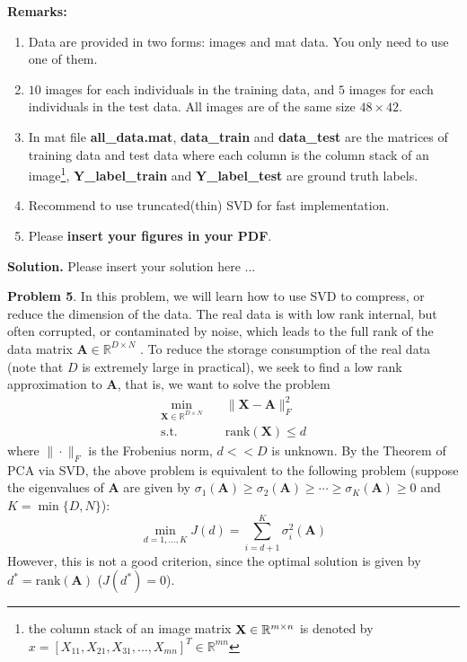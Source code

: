 \documentclass[english,onecolumn]{IEEEtran}
\newcommand{\Rbb}{\mathbb{R}}
\newcommand{\bX}{{\bf X}}
\begin{document}
{\bf Remarks:}
\begin{enumerate}
    \item Data are provided in two forms: images and mat data. You only need to use one of them. 
    \item $10$ images for each individuals in the training data, and $5$ images for each individuals in the test data. All images are of the same size $48\times 42$.
    \item In mat file \textbf{all\_data.mat}, \textbf{data\_train} and \textbf{data\_test} are the matrices of training data and test data where each column is the column stack of an image\footnote{the column stack of an image matrix $\bX\in \Rbb^{m\times n}$ is denoted by $x = [X_{11},X_{21},X_{31},...,X_{mn}]^T\in\Rbb^{mn}$}, \textbf{Y\_label\_train} and \textbf{Y\_label\_test} are ground truth labels.
    \item Recommend to use truncated(thin) SVD for fast implementation.
    \item Please \textbf{insert your figures in your PDF}.
\end{enumerate}

\noindent
\textbf{Solution.}
Please insert your solution here ...


\clearpage
\newpage
\noindent\textbf{Problem 5}.
In this problem, we will learn how to use SVD to compress, or reduce the dimension of the data. The real data is with low rank internal, but often corrupted, or contaminated by noise, which leads to the full rank of the data matrix $\mathbf{A}\in\mathbb{R}^{D\times N}$ . To reduce the storage consumption of the real data (note that $D$ is extremely large in practical), we seek to find a low rank approximation to  $\mathbf{A}$, that is, we want to solve the problem
\begin{align}
    \min_{\mathbf{X}\in\mathbb{R}^{D\times N}}&\quad \|\mathbf{X}-\mathbf{A}\|_F^2\\
    \mathrm{s.t.}&\quad \mathrm{rank}(\mathbf{X})\leq d
\end{align}
where $\|\cdot\|_F$ is the Frobenius norm, $d<< D$ is unknown.
By the Theorem of PCA via SVD, the above problem is equivalent to the following problem (suppose the eigenvalues of $\mathbf{A}$ are given by $\sigma_1(\mathbf{A})\geq\sigma_2(\mathbf{A})\geq\cdots\geq \sigma_K(\mathbf{A})\geq0$ and $K=\min\{D,N\}$):
\begin{equation}
    \min_{d=1,\dots,K}J(d)=\sum_{i=d+1}^K\sigma_i^2(\mathbf{A})
\end{equation}
However, this is not a good criterion, since the optimal solution is given by $d^*=\mathrm{rank}(\mathbf{A})$ ($J(d^*)=0$).
\end{document}
